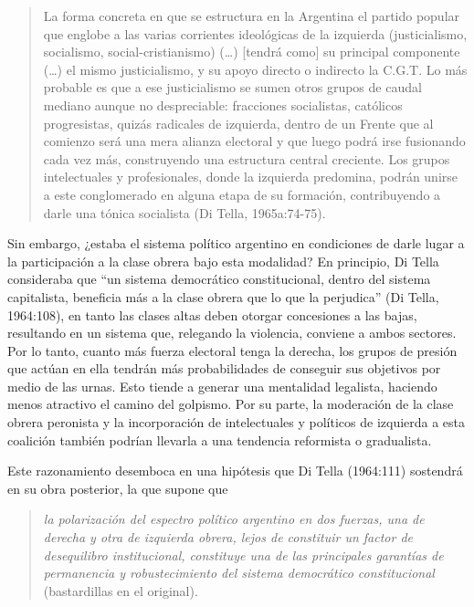\begin{quote}
La forma concreta en que se estructura en la Argentina el partido popular que englobe a las varias corrientes ideológicas de la izquierda (justicialismo, socialismo, social-cristianismo) (\ldots) {[}tendrá como{]} su principal componente (\ldots) el mismo justicialismo, y su apoyo directo o indirecto la C.G.T. Lo más probable es que a ese justicialismo se sumen otros grupos de caudal mediano aunque no despreciable: fracciones socialistas, católicos progresistas, quizás radicales de izquierda, dentro de un Frente que al comienzo será una mera alianza electoral y que luego podrá irse fusionando cada vez más, construyendo una estructura central creciente. Los grupos intelectuales y profesionales, donde la izquierda predomina, podrán unirse a este conglomerado en alguna etapa de su formación, contribuyendo a darle una tónica socialista (Di Tella, 1965a:74-75).
\end{quote}

Sin embargo, ¿estaba el sistema político argentino en condiciones de darle lugar a la participación a la clase obrera bajo esta modalidad? En principio, Di Tella consideraba que ``un sistema democrático constitucional, dentro del sistema capitalista, beneficia más a la clase obrera que lo que la perjudica'' (Di Tella, 1964:108), en tanto las clases altas deben otorgar concesiones a las bajas, resultando en un sistema que, relegando la violencia, conviene a ambos sectores. Por lo tanto, cuanto más fuerza electoral tenga la derecha, los grupos de presión que actúan en ella tendrán más probabilidades de conseguir sus objetivos por medio de las urnas. Esto tiende a generar una mentalidad legalista, haciendo menos atractivo el camino del golpismo. Por su parte, la moderación de la clase obrera peronista y la incorporación de intelectuales y políticos de izquierda a esta coalición también podrían llevarla a una tendencia reformista o gradualista.

Este razonamiento desemboca en una hipótesis que Di Tella (1964:111) sostendrá en su obra posterior, la que supone que

\begin{quote}
\emph{la polarización del espectro político argentino en dos fuerzas, una de derecha y otra de izquierda obrera, lejos de constituir un factor de desequilibro institucional, constituye una de las principales garantías de permanencia y robustecimiento del sistema democrático constitucional} (bastardillas en el original).
\end{quote}

